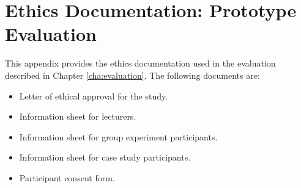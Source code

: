 \chapter{Ethics Documentation: Prototype Evaluation \label{cha:app5}}

This appendix provides the ethics documentation used in the evaluation described 
in Chapter \ref{cha:evaluation}. The following documents are:

\begin{itemize}
  \item Letter of ethical approval for the study.
  \item Information sheet for lecturers.
  \item Information sheet for group experiment participants.
  \item Information sheet for case study participants.
  \item Participant consent form.
\end{itemize}










 

